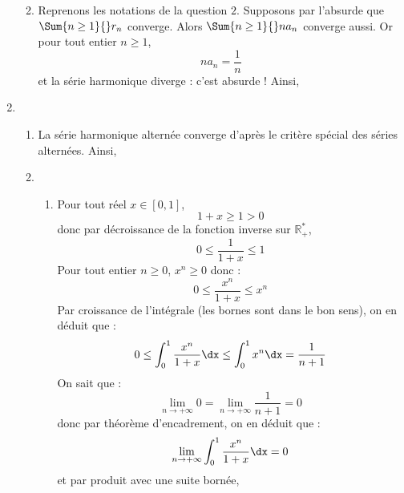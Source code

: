 \documentclass[a4paper,twoside,french,10pt]{VcCours}
\begin{document}
\begin{enumerate}
\begin{enumerate}
        
        \item Reprenons les notations de la question $2$. Supposons par l'absurde que $\Sum{n \geq 1}{} r_n$ converge. Alors $\Sum{n \geq 1}{} na_n$ converge aussi. Or pour tout entier $n \geq 1$,
        $$ n a_n = \dfrac{1}{n}$$
        et la série harmonique diverge : c'est absurde ! Ainsi,
    
    \end{enumerate}
    
    \item 
    
    \begin{enumerate}
    
    \item La série harmonique alternée converge d'après le critère spécial des séries alternées. Ainsi,
    
    
    \item 
    
    \begin{enumerate}
    
    \item Pour tout réel $x \in [0,1]$,
    $$ 1+x \geq 1 >0$$
    donc par décroissance de la fonction inverse sur $\mathbb{R}_+^*$,
    $$ 0 \leq \dfrac{1}{1+x} \leq 1$$
    Pour tout entier $n \geq 0$, $x^n \geq 0$ donc :
    $$ 0 \leq \dfrac{x^n}{1+x} \leq x^n$$
    Par croissance de l'intégrale (les bornes sont dans le bon sens), on en déduit que :
    $$ 0 \leq \int_{0}^1 \dfrac{x^n}{1+x} \dx \leq \int_{0}^1 x^n \dx = \dfrac{1}{n+1}$$
    On sait que :
    $$ \lim_{n \rightarrow + \infty} 0 =  \lim_{n \rightarrow + \infty} \dfrac{1}{n+1}=0$$
    donc par théorème d'encadrement, on en déduit que :
    $$ \lim_{n \rightarrow + \infty} \int_{0}^1 \dfrac{x^n}{1+x} \dx = 0$$
    et par produit avec une suite bornée, 
    

\end{enumerate}
\end{enumerate}
\end{enumerate}
\end{document}

